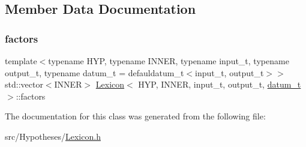 \subsection{Member Data Documentation}
\mbox{\label{class_lexicon_ac70865eb23b1e23f53f21e1760adac00}} 
\subsubsection{\texorpdfstring{factors}{factors}}
{\footnotesize\ttfamily template$<$typename H\+YP, typename I\+N\+N\+ER, typename input\+\_\+t, typename output\+\_\+t, typename datum\+\_\+t = defauldatum\+\_\+t$<$input\+\_\+t, output\+\_\+t$>$$>$ \\
std\+::vector$<$I\+N\+N\+ER$>$ \hyperlink{class_lexicon}{Lexicon}$<$ H\+YP, I\+N\+N\+ER, input\+\_\+t, output\+\_\+t, \hyperlink{class_bayesable_a9f1a6c0cd7855550fa10b1a8f13a5867}{datum\+\_\+t} $>$\+::factors}



The documentation for this class was generated from the following file\+:\begin{DoxyCompactItemize}
\item 
src/\+Hypotheses/\hyperlink{_lexicon_8h}{Lexicon.\+h}\end{DoxyCompactItemize}
